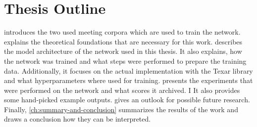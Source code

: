 
\section{Thesis Outline}

 introduces the two used meeting corpora which are used to train the network.
 explains the theoretical foundations that are necessary for this work.
 describes the model architecture of the network used in this thesis.
It also explains, how the network was trained and what steps were performed to prepare the training data.
Additionally, it focuses on the actual implementation with the Texar library \cite{hu2019texar} and what hyperparameters where used for training.
 presents the experiments that were performed on the network and what scores it archived. I
It also provides some hand-picked example outputs.
 gives an outlook for possible future research.
Finally, \cref{ch:summary-and-conclusion} summarizes the results of the work and draws a conclusion how they can be interpreted.
